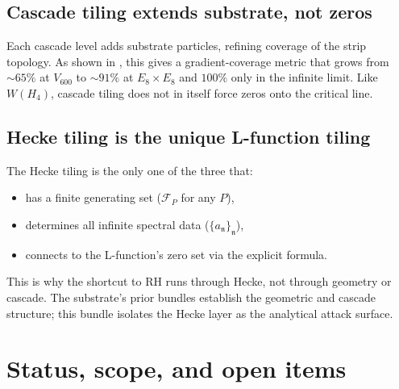 \documentclass[11pt,a4paper]{article}
\theoremstyle{definition}
\begin{document}
\subsection{Cascade tiling extends substrate, not zeros}
Each cascade level adds substrate particles, refining coverage of the strip
topology. As shown in \cite{GradientBridge}, this gives a gradient-coverage
metric that grows from $\sim\!65\%$ at $V_{600}$ to $\sim\!91\%$ at $E_8\!\times\!E_8$
and $100\%$ only in the infinite limit. Like $W(H_4)$, cascade tiling does not
in itself force zeros onto the critical line.

\subsection{Hecke tiling is the unique L-function tiling}
The Hecke tiling is the only one of the three that:
\begin{itemize}
\item has a finite generating set ($\mathcal{F}_P$ for any $P$),
\item determines all infinite spectral data ($\{a_\mathfrak{n}\}_{\mathfrak{n}}$),
\item connects to the L-function's zero set via the explicit formula.
\end{itemize}

This is why the shortcut to RH runs through Hecke, not through geometry or
cascade. The substrate's prior bundles establish the geometric and cascade
structure; this bundle isolates the Hecke layer as the analytical attack
surface.

\section{Status, scope, and open items}\label{sec:status}
\end{document}
